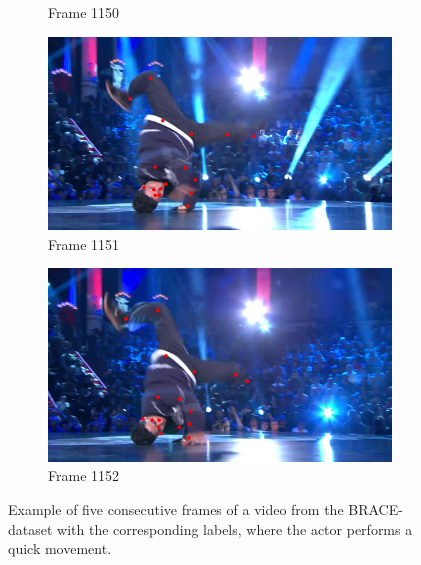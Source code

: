 \documentclass[./main.tex]{subfiles}
\begin{document}
\begin{figure}[htbp]
\begin{subfigure}{0.5\textwidth}
        \caption{Frame 1150}
    \end{subfigure}
    \begin{subfigure}{0.5\textwidth}
        \centering
        \includegraphics[width=\textwidth]{entities/BRACE_1151.png}
        \caption{Frame 1151}
    \end{subfigure}
    \begin{subfigure}{0.5\textwidth}
        \centering
        \includegraphics[width=\textwidth]{entities/BRACE_1152.png}
        \caption{Frame 1152}
    \end{subfigure}
    \caption{Example of five consecutive frames of a video from the BRACE-dataset with the corresponding labels, where the actor performs a quick movement.}
    \label{fig:BRACE_dataset_quick}
\end{figure}
\end{document}
